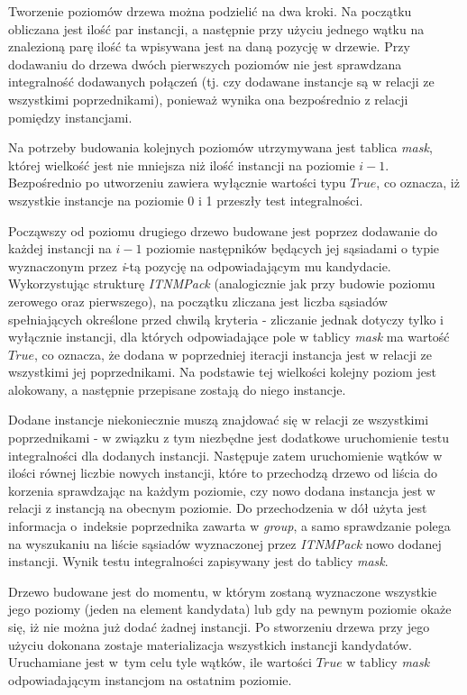 \documentclass[12pt]{article}
\begin{document}
Tworzenie poziomów drzewa można podzielić na dwa kroki. Na początku obliczana jest ilość par instancji, a następnie przy użyciu jednego wątku na znalezioną parę ilość ta wpisywana jest na daną pozycję w drzewie. Przy dodawaniu do drzewa dwóch pierwszych poziomów nie jest sprawdzana integralność dodawanych połączeń (tj. czy dodawane instancje są w relacji ze wszystkimi poprzednikami), ponieważ wynika ona bezpośrednio z relacji pomiędzy instancjami.

Na potrzeby budowania kolejnych poziomów utrzymywana jest tablica \textit{mask}, której wielkość jest nie mniejsza niż ilość instancji na poziomie $ i - 1 $. Bezpośrednio po utworzeniu zawiera wyłącznie wartości typu $ True $, co oznacza, iż wszystkie instancje na poziomie 0 i 1 przeszły test integralności.

Począwszy od poziomu drugiego drzewo budowane jest poprzez dodawanie do każdej instancji na $ i - 1 $ poziomie następników będących jej sąsiadami o typie wyznaczonym przez \textit{i}-tą pozycję na odpowiadającym mu kandydacie. Wykorzystując strukturę \textit{ITNMPack} (analogicznie jak przy budowie poziomu zerowego oraz pierwszego), na początku zliczana jest liczba sąsiadów spełniających określone przed chwilą kryteria - zliczanie jednak dotyczy tylko i wyłącznie instancji, dla których odpowiadające pole w tablicy \textit{mask} ma wartość $ True $, co oznacza, że dodana w poprzedniej iteracji instancja jest w relacji ze wszystkimi jej poprzednikami. Na podstawie tej wielkości kolejny poziom jest alokowany, a następnie przepisane zostają do niego instancje.

Dodane instancje niekoniecznie muszą znajdować się w relacji ze wszystkimi poprzednikami - w związku z tym niezbędne jest dodatkowe uruchomienie testu integralności dla dodanych instancji. Następuje zatem uruchomienie wątków w ilości równej liczbie nowych instancji, które to przechodzą drzewo od liścia do korzenia sprawdzając na każdym poziomie, czy nowo dodana instancja jest w relacji z instancją na obecnym poziomie. Do przechodzenia w dół użyta jest informacja o~indeksie poprzednika zawarta w \textit{group}, a samo sprawdzanie polega na wyszukaniu na liście sąsiadów wyznaczonej przez \textit{ITNMPack} nowo dodanej instancji. Wynik testu integralności zapisywany jest do tablicy \textit{mask}.

Drzewo budowane jest do momentu, w którym zostaną wyznaczone wszystkie jego poziomy (jeden na element kandydata) lub gdy na pewnym poziomie okaże się, iż nie można już dodać żadnej instancji. Po stworzeniu drzewa przy jego użyciu dokonana zostaje materializacja wszystkich instancji kandydatów. Uruchamiane jest w~tym celu tyle wątków, ile wartości $ True $ w tablicy \textit{mask} odpowiadającym instancjom na ostatnim poziomie. 
\end{document}
